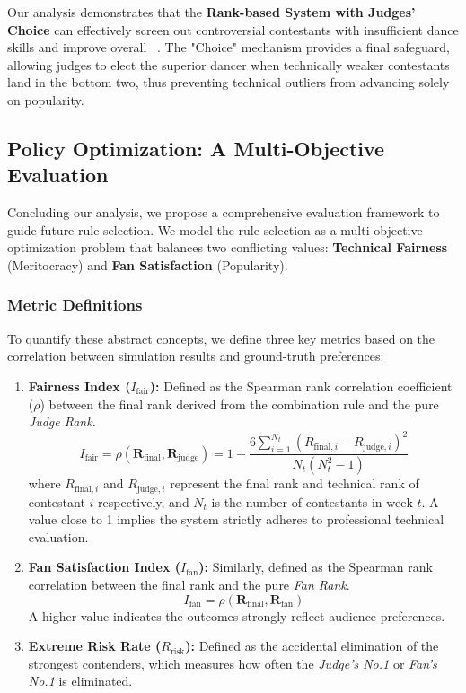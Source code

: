 Our analysis demonstrates that the \textbf{Rank-based System with Judges' Choice} can effectively
screen out controversial contestants with insufficient dance skills and
improve overall ~\cite{dehnart2010audience}.
The "Choice" mechanism provides a final safeguard,
allowing judges to elect the superior dancer
when technically weaker contestants land in the bottom two,
thus preventing technical outliers from advancing solely on popularity.

\subsection{Policy Optimization: A Multi-Objective Evaluation}
Concluding our analysis, we propose a comprehensive evaluation framework to guide future rule selection. We model the rule selection as a multi-objective optimization problem that balances two conflicting values: \textbf{Technical Fairness} (Meritocracy) and \textbf{Fan Satisfaction} (Popularity).

\subsubsection{Metric Definitions}
To quantify these abstract concepts, we define three key metrics based on the correlation between simulation results and ground-truth preferences:
\begin{enumerate}
    \item \textbf{Fairness Index ($I_{\text{fair}}$):}
          Defined as the Spearman rank correlation coefficient ($\rho$) between the final rank derived from the combination rule and the pure \textit{Judge Rank}.
          \begin{equation}
          I_{\text{fair}} = \rho(\mathbf{R}_{\text{final}}, \mathbf{R}_{\text{judge}}) = 1 - \frac{6 \sum_{i=1}^{N_t} (R_{\text{final}, i} - R_{\text{judge}, i})^2}{N_t(N_t^2 - 1)}
          \end{equation}
          where $R_{\text{final}, i}$ and $R_{\text{judge}, i}$ represent the final rank and technical rank of contestant $i$ respectively, and $N_t$ is the number of contestants in week $t$.
          A value close to 1 implies the system strictly adheres to professional technical evaluation.

    \item \textbf{Fan Satisfaction Index ($I_{\text{fan}}$):}
          Similarly, defined as the Spearman rank correlation between the final rank and the pure \textit{Fan Rank}.
          \begin{equation}
          I_{\text{fan}} = \rho(\mathbf{R}_{\text{final}}, \mathbf{R}_{\text{fan}})
          \end{equation}
          A higher value indicates the outcomes strongly reflect audience preferences.

    \item \textbf{Extreme Risk Rate ($R_{\text{risk}}$):}
          Defined as the accidental elimination of the
          strongest contenders,
          which measures how often the \textit{Judge's No.1} or \textit{Fan's No.1} is eliminated.
\end{enumerate}

